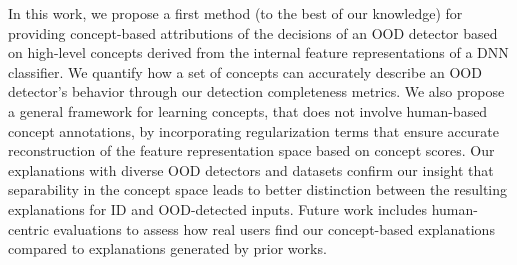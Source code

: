 

In this work, we propose a first method (to the best of our knowledge) for providing concept-based attributions of the decisions of an OOD detector based on high-level concepts derived from the internal feature representations of a DNN classifier.
We quantify how a set of concepts can  accurately describe an OOD detector's behavior through our detection completeness metrics. 
We also propose a general framework for learning concepts, that does not involve human-based concept annotations, by incorporating regularization terms that ensure accurate reconstruction of the feature representation space based on concept scores.
Our explanations with diverse OOD detectors and datasets confirm our insight that separability in the concept space leads to better distinction between the resulting explanations for ID and OOD-detected inputs.
Future work includes human-centric evaluations \cite{doshi2017towards, poursabzi2021manipulating} to assess how real users find our concept-based explanations compared to explanations generated by prior works.

\fi
